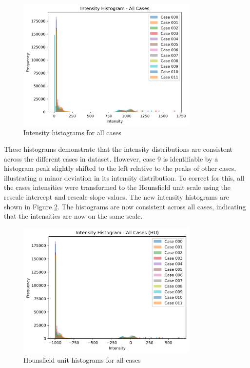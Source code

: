 \documentclass[11pt]{article}
\begin{document}
\begin{figure}[H]
    \centering
    \includegraphics[width=0.8\textwidth]{figs/intensity_histogram_orig.png}
    \caption{Intensity histograms for all cases}
    \label{fig:intensity_histograms}
\end{figure}

These histograms demonstrate that the intensity distributions are consistent across the different cases in dataset. However, case 9 is identifiable by a histogram peak slightly shifted to the left relative to the peaks of other cases, illustrating a minor deviation in its intensity distribution. To correct for this, all the cases intensities were transformed to the Hounsfield unit scale using the rescale intercept and rescale slope values. The new intensity histograms are shown in Figure \ref{fig:hounsfield_histograms_hu}. The histograms are now consistent across all cases, indicating that the intensities are now on the same scale.

\begin{figure}[H]
    \centering
    \includegraphics[width=0.8\textwidth]{figs/intensity_histogram_hu.png}
    \caption{Hounsfield unit histograms for all cases}
    \label{fig:hounsfield_histograms_hu}
\end{figure}
\end{document}
